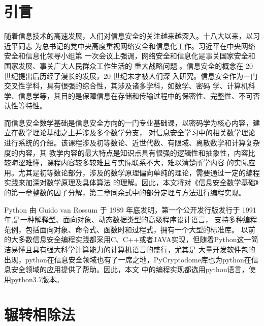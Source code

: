 \documentclass[UTF8]{ctexart}
\begin{document}
\section{引言}
\par 随着信息技术的高速发展，人们对信息安全的关注越来越深入。十八大以来，以习近平同志
为总书记的党中央高度重视网络安全和信息化工作。习近平在中央网络安全和信息化领导小组第
一次会议上强调，网络安全和信息化是事关国家安全和国家发展、事关广大人民群众工作生活的
重大战略问题 。信息安全的概念在 20 世纪提出后历经了漫长的发展，20 世纪末才被人们深
入研究。信息安全作为一门交叉性学科，具有很强的综合性，其涉及诸多学科，如数学、密码
学、计算机科学、信息学等，其目的是保障信息在存储和传输过程中的保密性、完整性、不可否
认性等特性\cite{ref1}。
\par 而信息安全数学基础是信息安全方向的一门专业基础课，以密码学为核心内容，建立在数学理论基础之上并涉及多个数学分支，
对信息安全学习中的相关数学理论进行系统的介绍。该课程涉及初等数论、近世代数、有限域、离散数学和计算复杂度的内容，其
教学内容的最大特点是知识点具有很强的逻辑性和抽象性，内容比较晦涩难懂，课程内容较多较难且与实际联系不大，难以清楚所学内容
的实际应用\cite{ref2,ref3}。尤其是初等数论部分，涉及的数学原理偏向单纯的理论，需要通过一定的编程实践来加深对数学原理及具体算法
的理解。因此，本文将对《信息安全数学基础》的第一章整数的因子分解，第二章同余式中的部分定理与方法进行编程实现。
\par Python 由 Guido van Rossum 于 1989 年底发明，第一个公开发行版发行于 1991 年,是一种解释型、面向对象、动态数据类型的高级程序设计语言，
支持多种编程范例，包括面向对象、命令式、函数时和过程式，拥有一个大型的标准库。
以前的大多数信息安全编程实践都采用C、C++或者JAVA实现，但随着Python这一简洁易懂且具有强大科学计算能力的计算机语言的盛行，尤其是
大量开发软件包的出现，python在信息安全领域也有了一席之地，PyCryptodome库也为python在信息安全领域的应用提供了帮助。因此，本文
中的编程实现都选用python语言，使用python3.7版本。





\section{辗转相除法}
\end{document}
